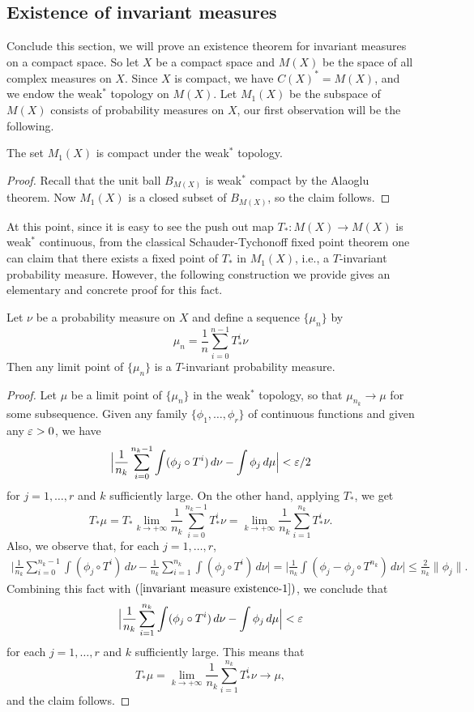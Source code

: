 \subsection{Existence of invariant measures}
Conclude this section, we will prove an existence theorem for invariant measures on a compact space. So let $X$ be a compact space and $M(X)$ be the space of all complex measures on $X$. Since $X$ is compact, we have $C(X)^*=M(X)$, and we endow the weak$^*$ topology on $M(X)$. Let $M_1(X)$ be the subspace of $M(X)$ consists of probability measures on $X$, our first observation will be the following.
\begin{proposition}
The set $M_1(X)$ is compact under the weak$^*$ topology.
\end{proposition}
\begin{proof}
Recall that the unit ball $B_{M(X)}$ is weak$^*$ compact by the Alaoglu theorem. Now $M_1(X)$ is a closed subset of $B_{M(X)}$, so the claim follows.
\end{proof}
At this point, since it is easy to see the push out map $T_*:M(X)\to M(X)$ is weak$^*$ continuous, from the classical Schauder-Tychonoff fixed point theorem one can claim that there exists a fixed point of $T_*$ in $M_1(X)$, i.e., a $T$-invariant probability measure. However, the following construction we provide gives an elementary and concrete proof for this fact.
\begin{proposition}\label{invariant measure existence}
Let $\nu$ be a probability measure on $X$ and define a sequence $\{\mu_n\}$ by
\[\mu_n=\frac{1}{n}\sum_{i=0}^{n-1}T_*^i\nu\]
Then any limit point of $\{\mu_n\}$ is a $T$-invariant probability measure.
\end{proposition}
\begin{proof}
Let $\mu$ be a limit point of $\{\mu_n\}$ in the weak$^*$ topology, so that $\mu_{n_k}\to\mu$ for some subsequence. Given any family $\{\phi_1,\dots,\phi_r\}$ of continuous functions and given any $\varepsilon>0$, we have
\begin{align}\label{invariant measure existence-1}
\Big|\frac{1}{n_k}\sum_{i=0}^{n_k-1}\int(\phi_j\circ T^i)\,d\nu-\int\phi_j\,d\mu\Big|<\varepsilon/2
\end{align}
for $j=1,\dots,r$ and $k$ sufficiently large. On the other hand, applying $T_*$, we get
\[T_*\mu=T_*\lim_{k\to+\infty}\frac{1}{n_k}\sum_{i=0}^{n_k-1}T^i_*\nu=\lim_{k\to+\infty}\frac{1}{n_k}\sum_{i=1}^{n_k}T^i_*\nu.\] 
Also, we observe that, for each $j=1,\dots,r$,
\begin{align*}
\Big|\frac{1}{n_k}\sum_{i=0}^{n_k-1}\int(\phi_j\circ T^i)\,d\nu-\frac{1}{n_k}\sum_{i=1}^{n_k}\int(\phi_j\circ T^i)\,d\nu\Big|=\Big|\frac{1}{n_k}\int(\phi_j-\phi_j\circ T^{n_k})\,d\nu\Big|\leq\frac{2}{n_k}\|\phi_j\|.
\end{align*}
Combining this fact with $(\ref{invariant measure existence-1})$, we conclude that
\[\Big|\frac{1}{n_k}\sum_{i=1}^{n_k}\int(\phi_j\circ T^i)\,d\nu-\int\phi_j\,d\mu\Big|<\varepsilon\]
for each $j=1,\dots,r$ and $k$ sufficiently large. This means that
\[T_*\mu=\lim_{k\to+\infty}\frac{1}{n_k}\sum_{i=1}^{n_k}T_*^i\nu\to\mu,\]
and the claim follows.
\end{proof}
